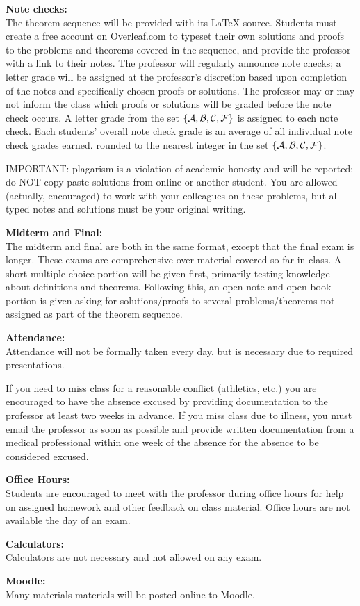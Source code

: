 {\textbf{Note checks:} \\
The theorem sequence will be provided with its \LaTeX{} source. Students must
create a free account on Overleaf.com to typeset their own solutions and
proofs to the problems and theorems covered in the sequence, and provide
the professor with a link to their notes. The professor will regularly announce
note checks; a letter grade will be assigned at the professor's discretion based
upon completion of the notes and specifically chosen proofs or solutions.
The professor may or may not inform the class which proofs or solutions will
be graded before the note check occurs. A letter grade
from the set \(\{\mathcal A,\mathcal B,\mathcal C,\mathcal F\}\) is assigned to each note check.
Each students' overall note check grade is an average of all individual
note check grades earned. rounded to the nearest integer in the set
\(\{\mathcal A,\mathcal B,\mathcal C,\mathcal F\}\).

IMPORTANT: plagarism is a violation
of academic honesty and will be reported; do NOT copy-paste solutions from
online or another student. You are allowed (actually, encouraged) to work
with your colleagues on these problems, but all typed notes and solutions
must be your original writing.

\textbf{Midterm and Final:} \\
The midterm and final are both in the same format, except that the final
exam is longer. These exams are comprehensive over material covered so far
in class. A short multiple choice portion will be given first, primarily
testing knowledge about definitions and theorems. Following this, an
open-note and open-book portion is given asking for solutions/proofs
to several problems/theorems not assigned as part of the theorem sequence.

\textbf{Attendance:} \\
Attendance will not be formally taken every day, but is necessary due to
required presentations.

If you need to miss
class for a reasonable conflict (athletics, etc.) you are encouraged to
have the absence excused by providing documentation to
the professor at least two weeks in advance.
If you miss class due to illness, you must email the professor as soon as
possible and provide written
documentation from a medical professional within one week of the absence
for the absence to be considered excused.

\textbf{Office Hours:} \\
Students are encouraged to meet with the professor during office hours
for help on assigned homework and other feedback on class material.
Office hours are not available the day of an exam.

\textbf{Calculators:} \\
Calculators are not necessary and not allowed on any exam.

\textbf{Moodle:}\\
Many materials materials will be posted online to Moodle.
}


